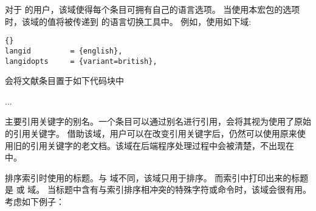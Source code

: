 \begin{fieldlist}



对于  的用户，该域使得每个条目可拥有自己的语言选项。
当使用本宏包的选项  时，该域的值将被传递到  的语言切换工具中。
例如，使用如下域:

\begin{lstlisting}[style=bibtex]{}
langid         = {english},
langidopts     = {variant=british},
\end{lstlisting}
%
会将文献条目置于如下代码块中

\begin{ltxexample}
\english[variant=british]
...
\endenglish
\end{ltxexample}
%




主要引用关键字的别名。一个条目可以通过别名进行引用，\biblatex 会将其视为使用了原始的引用关键字。
借助该域，用户可以在改变引用关键字后，仍然可以使用原来使用旧的引用关键字的老文档。该域在后端程序处理过程中会被清楚，不出现在  中。




排序索引时使用的标题。与  域不同，该域只用于排序。
而索引中打印出来的标题是  或 域。
当标题中含有与索引排序相冲突的特殊字符或命令时，该域会很有用。考虑如下例子：


\end{fieldlist}
